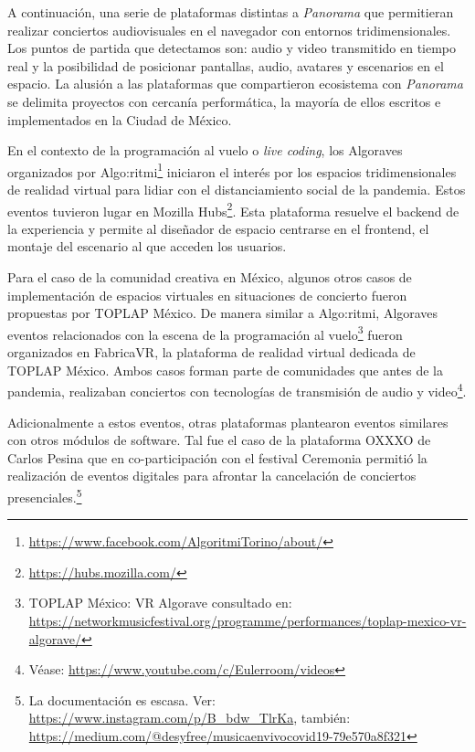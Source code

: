 

A continuación, una serie de plataformas distintas a \textit{Panorama} que permitieran realizar conciertos audiovisuales en el navegador con entornos tridimensionales. Los puntos de partida que detectamos son: audio y video transmitido en tiempo real y la posibilidad de posicionar pantallas, audio, avatares y escenarios en el espacio. La alusión a las plataformas que compartieron ecosistema con \textit{Panorama} se delimita proyectos con cercanía performática, la mayoría de ellos escritos e implementados en la Ciudad de México. 

En el contexto de la programación al vuelo o \textit{live coding}, los Algoraves organizados por Algo:ritmi\footnote{\url{https://www.facebook.com/AlgoritmiTorino/about/}} iniciaron el interés por los espacios tridimensionales de realidad virtual para lidiar con el distanciamiento social de la pandemia. Estos eventos tuvieron lugar en Mozilla Hubs\footnote{\url{https://hubs.mozilla.com/}}. Esta plataforma resuelve el backend de la experiencia y permite al diseñador de espacio centrarse en el frontend, el montaje del escenario al que acceden los usuarios.


Para el caso de la comunidad creativa en México, algunos otros casos de implementación de espacios virtuales en situaciones de concierto fueron propuestas por TOPLAP México. De manera similar a Algo:ritmi, Algoraves eventos relacionados con la escena de la programación al vuelo\footnote{TOPLAP México: VR Algorave consultado en: \url{https://networkmusicfestival.org/programme/performances/toplap-mexico-vr-algorave/}} fueron organizados en FabricaVR, la plataforma de realidad virtual dedicada de TOPLAP México. Ambos casos forman parte de comunidades que antes de la pandemia, realizaban conciertos con tecnologías de transmisión de audio y video\footnote{Véase: \url{https://www.youtube.com/c/Eulerroom/videos}}.%

Adicionalmente a estos eventos, otras plataformas plantearon eventos similares con otros módulos de software. Tal fue el caso de la plataforma OXXXO de Carlos Pesina que en co-participación con el festival Ceremonia permitió la realización de eventos digitales para afrontar la cancelación de conciertos presenciales.\footnote{La documentación es escasa. Ver: \url{https://www.instagram.com/p/B_bdw_TlrKa}, también: \url{https://medium.com/@desyfree/musicaenvivocovid19-79e570a8f321}}

